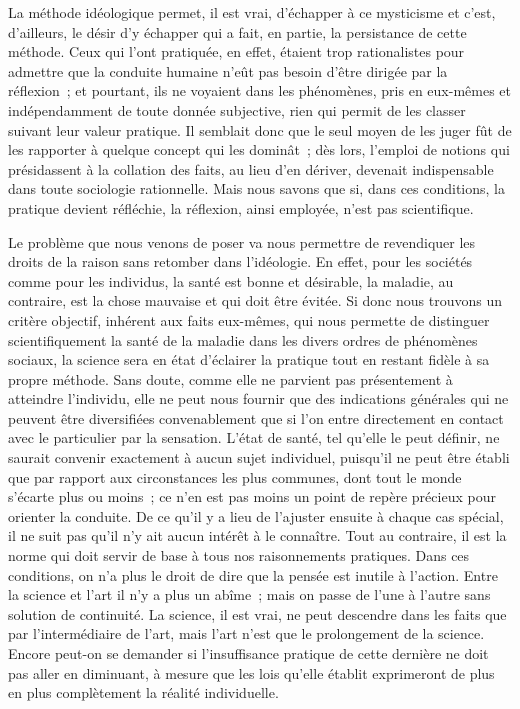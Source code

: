 \documentclass[french,twoside]{book} %
\begin{document}
La méthode idéologique permet, il est vrai, d’échapper à ce mysticisme et c’est, d’ailleurs, le désir d’y échapper qui a fait, en partie, la persistance de cette méthode. Ceux qui l’ont pratiquée, en effet, étaient trop rationalistes pour admettre que la conduite humaine n’eût pas besoin d’être dirigée par la réflexion ; et pourtant, ils ne voyaient dans les phénomènes, pris en eux-mêmes et indépendamment de toute donnée subjective, rien qui permit de les classer suivant leur valeur pratique. Il semblait donc que le seul moyen de les juger fût de les rapporter à quelque concept qui les dominât ; dès lors, l’emploi de notions qui présidassent à la collation des faits, au lieu d’en dériver, devenait indispensable dans toute sociologie rationnelle. Mais nous savons que si, dans ces conditions, la pratique devient réfléchie, la réflexion, ainsi employée, n’est pas scientifique.\par
Le problème que nous venons de poser va nous permettre de revendiquer les droits de la raison sans retomber dans l’idéologie. En effet, pour les sociétés comme pour les individus, la santé est bonne et désirable, la maladie, au contraire, est la chose mauvaise et qui doit être évitée. Si donc nous trouvons un critère objectif, inhérent aux faits eux-mêmes, qui nous permette de distinguer scientifiquement la santé de la maladie dans les divers ordres de phénomènes sociaux, la science sera en état d’éclairer la pratique tout en restant fidèle à sa propre méthode. Sans doute, comme elle ne parvient pas présentement à atteindre l’individu, elle ne peut nous fournir que des indications générales qui ne peuvent être diversifiées convenablement que si l’on entre directement en contact avec le particulier par la sensation. L’état de santé, tel qu’elle le peut définir, ne saurait convenir exactement à aucun sujet individuel, puisqu’il ne peut être établi que par rapport aux circonstances les plus communes, dont tout le monde s’écarte plus ou moins ; ce n’en est pas moins un point de repère précieux pour orienter la conduite. De ce qu’il y a lieu de l’ajuster ensuite à chaque cas spécial, il ne suit pas qu’il n’y ait aucun intérêt à le connaître. Tout au contraire, il est la norme qui doit servir de base à tous nos raisonnements pratiques. Dans ces conditions, on n’a plus le droit de dire que la pensée est inutile à l’action. Entre la science et l’art il n’y a plus un abîme ; mais on passe de l’une à l’autre sans solution de continuité. La science, il est vrai, ne peut descendre dans les faits que par l’intermédiaire de l’art, mais l’art n’est que le prolongement de la science. Encore peut-on se demander si l’insuffisance pratique de cette dernière ne doit pas aller en diminuant, à mesure que les lois qu’elle établit exprimeront de plus en plus complètement la réalité individuelle.\par
\end{document}
